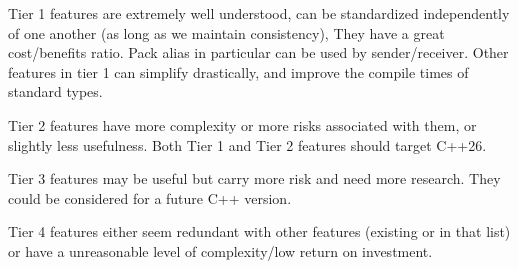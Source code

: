 \documentclass{wg21}
\begin{document}
Tier 1 features are extremely well understood, can be standardized independently of one another (as long as we maintain consistency),
They have a great cost/benefits ratio.
Pack alias in particular can be used by sender/receiver.
Other features in tier 1 can simplify drastically, and improve the compile times of standard types.

Tier 2 features have more complexity or more risks associated with them, or slightly less usefulness.
Both Tier 1 and Tier 2 features should target C++26.

Tier 3 features may be useful but carry more risk and need more research. They could be considered for a future C++ version.

Tier 4 features either seem redundant with other features (existing or in that list) or have a unreasonable level of complexity/low return on investment.
\end{document}
